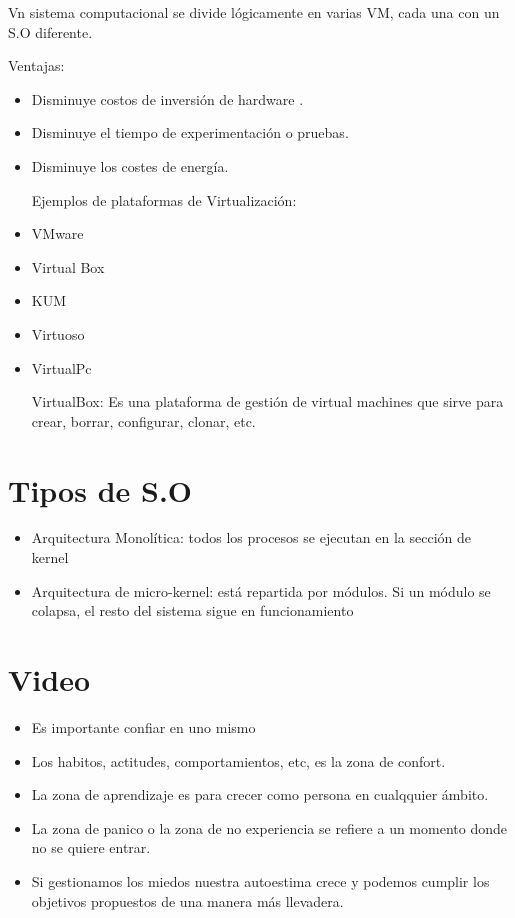 \documentclass[11pt,twoside]{book}
\begin{document}
\vspace{5pt}
Vn sistema computacional se divide lógicamente en varias VM, cada una con un S.O diferente.

\vspace{5pt}
Ventajas: 
\begin{itemize}
    \item Disminuye costos de inversión de hardware .
    \item Disminuye el tiempo de experimentación o pruebas.
    \item Disminuye los costes de energía.

\vspace{5pt}
Ejemplos de plataformas de Virtualización:
    \item VMware
    \item Virtual Box
    \item KUM
    \item Virtuoso
    \item VirtualPc

VirtualBox: Es una  plataforma de gestión de virtual machines que sirve para crear, borrar, configurar, clonar, etc.
\end{itemize}

\section{Tipos de S.O}
\begin{itemize}
    \item Arquitectura Monolítica: todos los procesos se ejecutan en la sección de kernel

    \item Arquitectura de micro-kernel: está repartida por módulos. Si un módulo se colapsa, el resto del sistema sigue en funcionamiento
\end{itemize}

\section{Video}
\begin{itemize}
    \item Es importante confiar en uno mismo
    \item Los habitos, actitudes, comportamientos, etc, es la zona de confort.
    \item La zona de aprendizaje es para crecer como persona en cualqquier ámbito.
    \item La zona de panico o la zona de no experiencia se refiere a un momento donde no se quiere entrar.
    \item Si gestionamos los miedos nuestra autoestima crece y podemos cumplir los objetivos propuestos de una manera más llevadera.

\end{itemize}
\end{document}
